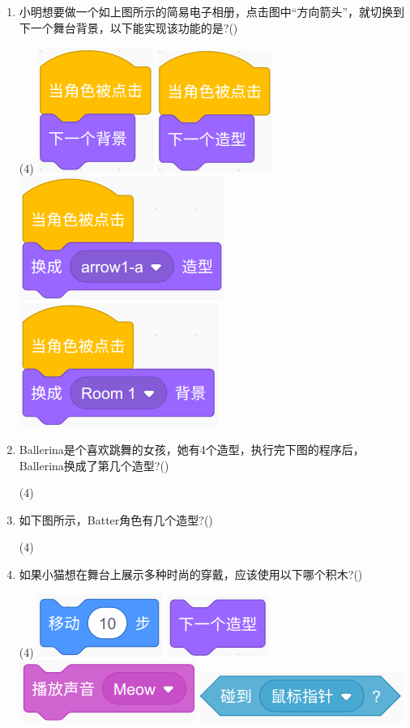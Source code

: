 \documentclass[10pt, a4paper]{article}
\begin{document}
\begin{enumerate}
        \item 小明想要做一个如上图所示的简易电子相册，点击图中“方向箭头”，就切换到下一个舞台背景，以下能实现该功能的是?(\qquad)
        \begin{tasks}(4)
            \task \includegraphics[width=.07\textwidth]{6a.png}
            \task \includegraphics[width=.07\textwidth]{6b.png}
            \task \includegraphics[width=.13\textwidth]{6c.png}
            \task \includegraphics[width=.13\textwidth]{6d.png}
        \end{tasks}
        
        \item Ballerina是个喜欢跳舞的女孩，她有4个造型，执行完下图的程序后，Ballerina换成了第几个造型?(\qquad)
        \begin{tasks}(4)
        \end{tasks}
           
        \newpage
        \item 如下图所示，Batter角色有几个造型?(\qquad)
        \begin{tasks}(4)
        \end{tasks}

        \item 如果小猫想在舞台上展示多种时尚的穿戴，应该使用以下哪个积木?(\qquad)
        \begin{tasks}(4)
            \task \includegraphics[width=.1\textwidth]{9a.png}
            \task \includegraphics[width=.08\textwidth]{9b.png}
            \task \includegraphics[width=.13\textwidth]{9c.png}
            \task \includegraphics[width=.15\textwidth]{9d.png}
        \end{tasks}


\end{enumerate}
\end{document}

